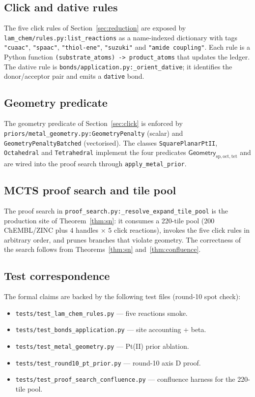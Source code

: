 \subsection{Click and dative rules}
The five click rules of Section~\ref{sec:reduction} are exposed by
\texttt{lam\_chem/rules.py:list\_reactions} as a name-indexed dictionary
with tags \texttt{"cuaac"}, \texttt{"spaac"}, \texttt{"thiol-ene"},
\texttt{"suzuki"} and \texttt{"amide coupling"}. Each rule is a Python
function \texttt{(substrate\_atoms) -> product\_atoms} that updates the
ledger. The dative rule is \texttt{bonds/application.py:\_orient\_dative};
it identifies the donor/acceptor pair and emits a \texttt{dative} bond.

\subsection{Geometry predicate}
The geometry predicate of Section~\ref{sec:click} is enforced by
\texttt{priors/metal\_geometry.py:GeometryPenalty} (scalar) and
\texttt{GeometryPenaltyBatched} (vectorised). The classes
\texttt{SquarePlanarPtII}, \texttt{Octahedral} and \texttt{Tetrahedral}
implement the four predicates $\mathsf{Geometry}_{\mathrm{sp},
\mathrm{oct}, \mathrm{tet}}$ and are wired into the proof search through
\texttt{apply\_metal\_prior}.

\subsection{MCTS proof search and tile pool}
The proof search in \texttt{proof\_search.py:\_resolve\_expand\_tile\_pool}
is the production site of Theorem~\ref{thm:sn}: it consumes a 220-tile pool
(200 ChEMBL/ZINC plus $4$ handles $\times$ $5$ click reactions), invokes
the five click rules in arbitrary order, and prunes branches that
violate geometry. The correctness of the search follows from
Theorems~\ref{thm:sn} and~\ref{thm:confluence}.

\subsection{Test correspondence}
The formal claims are backed by the following test files (round-10 spot
check):
\begin{itemize}
  \item \texttt{tests/test\_lam\_chem\_rules.py} — five reactions smoke.
  \item \texttt{tests/test\_bonds\_application.py} — site accounting + beta.
  \item \texttt{tests/test\_metal\_geometry.py} — Pt(II) prior ablation.
  \item \texttt{tests/test\_round10\_pt\_prior.py} — round-10 axis D proof.
  \item \texttt{tests/test\_proof\_search\_confluence.py} — confluence
        harness for the 220-tile pool.
\end{itemize}


